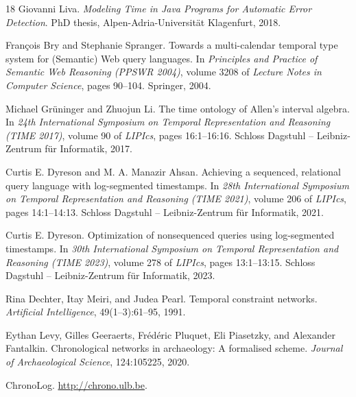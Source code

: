 \begin{thebibliography}{18}
  Giovanni Liva.
  \newblock \emph{Modeling Time in Java Programs for Automatic Error
  Detection}.
  \newblock PhD thesis, Alpen-Adria-Universit\"at Klagenfurt, 2018.

  Fran\c{c}ois Bry and Stephanie Spranger.
  \newblock Towards a multi-calendar temporal type system for
  (Semantic) Web query languages.
  \newblock In \emph{Principles and Practice of Semantic Web
  Reasoning (PPSWR 2004)}, volume 3208 of \emph{Lecture Notes in
  Computer Science}, pages 90--104. Springer, 2004.
  \newblock {}

  Michael Gr\"uninger and Zhuojun Li.
  \newblock The time ontology of Allen's interval algebra.
  \newblock In \emph{24th International Symposium on Temporal
  Representation and Reasoning (TIME 2017)}, volume 90 of
  \emph{LIPIcs}, pages 16:1--16:16. Schloss
  Dagstuhl -- Leibniz-Zentrum f\"ur Informatik, 2017.
  \newblock {}

  Curtis E. Dyreson and M. A. Manazir Ahsan.
  \newblock Achieving a sequenced, relational query language with
  log-segmented timestamps.
  \newblock In \emph{28th International Symposium on Temporal
  Representation and Reasoning (TIME 2021)}, volume 206 of
  \emph{LIPIcs}, pages 14:1--14:13. Schloss
  Dagstuhl -- Leibniz-Zentrum f\"ur Informatik, 2021.
  \newblock {}

  Curtis E. Dyreson.
  \newblock Optimization of nonsequenced queries using log-segmented
  timestamps.
  \newblock In \emph{30th International Symposium on Temporal
  Representation and Reasoning (TIME 2023)}, volume 278 of
  \emph{LIPIcs}, pages 13:1--13:15. Schloss
  Dagstuhl -- Leibniz-Zentrum f\"ur Informatik, 2023.
  \newblock {}

  Rina Dechter, Itay Meiri, and Judea Pearl.
  \newblock Temporal constraint networks.
  \newblock \emph{Artificial Intelligence}, 49(1--3):61--95, 1991.
  \newblock {}

  Eythan Levy, Gilles Geeraerts, Fr\'ed\'eric Pluquet, Eli Piasetzky,
  and Alexander Fantalkin.
  \newblock Chronological networks in archaeology: A formalised scheme.
  \newblock \emph{Journal of Archaeological Science}, 124:105225, 2020.
  \newblock {}

  ChronoLog.
  \newblock \url{http://chrono.ulb.be}.

\end{thebibliography}
